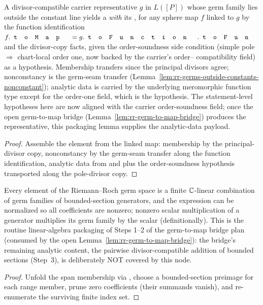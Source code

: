 \begin{lemma}
\label{lem:rr-carrier-representative-element}
A divisor-compatible carrier representative \(g\) in \(L([P])\) whose germ
family lies outside the constant line yields a
 \emph{with} its ,
for any sphere map \(f\) linked to \(g\) by the function identification
\(f.\code{toMap} = g.\code{toFunction}.\code{toFun}\) and the divisor-copy
facts, given the order-soundness side condition (simple pole \(\Rightarrow\)
chart-local order one, now backed by the carrier's order--
compatibility field) as a hypothesis. Membership
transfers since the principal divisors agree; nonconstancy is the germ-seam
transfer (Lemma~\ref{lem:rr-germs-outside-constants-nonconstant}); analytic
data is carried by the underlying meromorphic function type except for the
order-one field, which is the hypothesis. The statement-level hypotheses here
are now aligned with the carrier order-soundness field; once the open
germ-to-map bridge (Lemma~\ref{lem:rr-germ-to-map-bridge}) produces the
representative, this packaging lemma supplies the analytic-data payload.
\leanok
\end{lemma}
\begin{proof}\leanok
Assemble the element from the linked map: membership by the principal-divisor
copy, nonconstancy by the germ-seam transfer along the function
identification, analytic data from  and
 plus the order-soundness hypothesis transported along
the pole-divisor copy.
\end{proof}

\begin{lemma}
\label{lem:rr-span-expression-extraction}
Every element of the Riemann--Roch germ space is a finite \(\mathbb{C}\)-linear
combination of germ families of bounded-section generators, and the
expression can be normalized so all coefficients are nonzero; nonzero scalar
multiplication of a generator multiplies its germ family by the scalar
(definitionally). This is the routine linear-algebra packaging of Steps 1--2
of the germ-to-map bridge plan (consumed by the open
Lemma~\ref{lem:rr-germ-to-map-bridge}): the bridge's remaining analytic
content, the pairwise divisor-compatible addition of bounded sections
(Step~3), is deliberately NOT covered by this node.
\leanok
\end{lemma}
\begin{proof}\leanok
Unfold the span membership via , choose a
bounded-section preimage for each range member, prune zero coefficients
(their summands vanish), and re-enumerate the surviving finite index set.
\end{proof}

